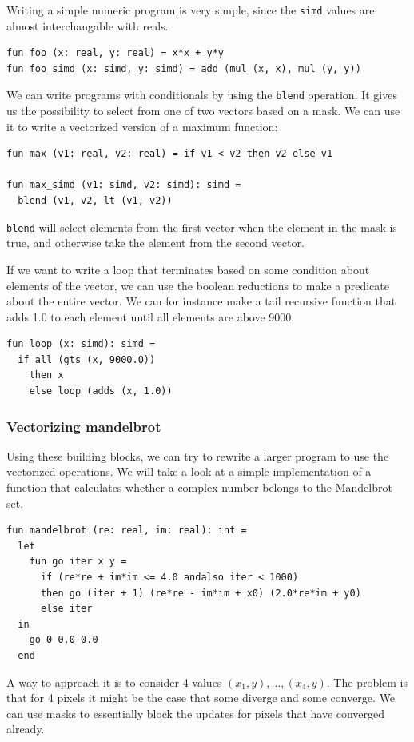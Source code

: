 \documentclass{article}
\begin{document}
Writing a simple numeric program is very simple, since the \verb!simd! values are almost interchangable with reals.
\begin{lstlisting}[frame=single, label={lst:numeric}, caption={Numeric program}]
fun foo (x: real, y: real) = x*x + y*y
fun foo_simd (x: simd, y: simd) = add (mul (x, x), mul (y, y))
\end{lstlisting}
We can write programs with conditionals by using the \texttt{blend} operation. It gives us the possibility to select from one of two vectors based on a mask. We can use it to write a vectorized version of a maximum function:
\begin{lstlisting}[frame=single, label={lst:max}, caption={Max function}]
fun max (v1: real, v2: real) = if v1 < v2 then v2 else v1

fun max_simd (v1: simd, v2: simd): simd =
  blend (v1, v2, lt (v1, v2))
\end{lstlisting}
\texttt{blend} will select elements from the first vector when the element in the mask is true, and otherwise take the element from the second vector.

If we want to write a loop that terminates based on some condition about elements of the vector, we can use the boolean reductions to make a predicate about the entire vector.
We can for instance make a tail recursive function that adds 1.0 to each element until all elements are above 9000.
\begin{lstlisting}[frame=single, label={lst:max}, caption={Iteration with guard}]
fun loop (x: simd): simd =
  if all (gts (x, 9000.0))
    then x
    else loop (adds (x, 1.0))
\end{lstlisting}

\subsubsection{Vectorizing mandelbrot}

Using these building blocks, we can try to rewrite a larger program to use the vectorized operations. We will take a look at a simple implementation of a function that calculates whether a complex number belongs to the Mandelbrot set.
\begin{lstlisting}[frame=single, label={lst:scalar_mandel}, caption={Scalar Mandelbrot}]
fun mandelbrot (re: real, im: real): int =
  let
    fun go iter x y =
      if (re*re + im*im <= 4.0 andalso iter < 1000)
      then go (iter + 1) (re*re - im*im + x0) (2.0*re*im + y0)
      else iter
  in
    go 0 0.0 0.0
  end
\end{lstlisting}
A way to approach it is to consider 4 values $(x_1, y), \ldots, (x_4, y)$. The problem is that for 4 pixels it might be the case that some diverge and some converge. We can use masks to essentially block the updates for pixels that have converged already.
\end{document}
